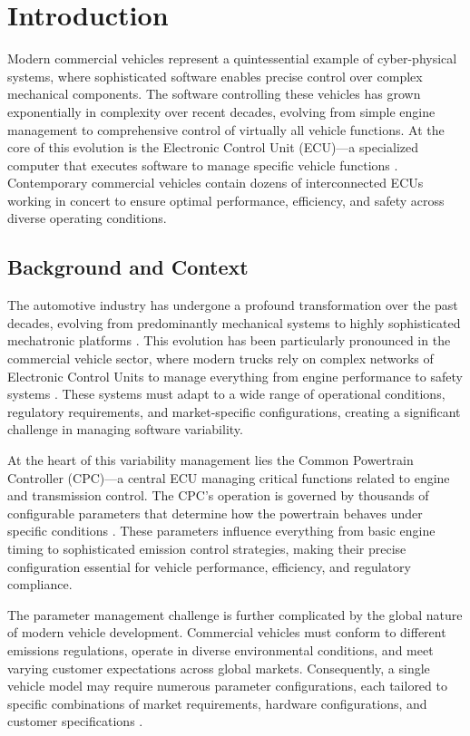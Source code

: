 \chapter{Introduction}
\label{chap:introduction}

Modern commercial vehicles represent a quintessential example of cyber-physical systems, where sophisticated software enables precise control over complex mechanical components. The software controlling these vehicles has grown exponentially in complexity over recent decades, evolving from simple engine management to comprehensive control of virtually all vehicle functions. At the core of this evolution is the Electronic Control Unit (ECU)—a specialized computer that executes software to manage specific vehicle functions \cite{broy2006challenges}. Contemporary commercial vehicles contain dozens of interconnected \acp{ECU} working in concert to ensure optimal performance, efficiency, and safety across diverse operating conditions.

\section{Background and Context}
\label{sec:background}

The automotive industry has undergone a profound transformation over the past decades, evolving from predominantly mechanical systems to highly sophisticated mechatronic platforms \cite{pretschner2007software}. This evolution has been particularly pronounced in the commercial vehicle sector, where modern trucks rely on complex networks of Electronic Control Units to manage everything from engine performance to safety systems \cite{broy2006challenges}. These systems must adapt to a wide range of operational conditions, regulatory requirements, and market-specific configurations, creating a significant challenge in managing software variability.

At the heart of this variability management lies the Common Powertrain Controller (\ac{CPC})—a central \ac{ECU} managing critical functions related to engine and transmission control. The \ac{CPC}'s operation is governed by thousands of configurable parameters that determine how the powertrain behaves under specific conditions \cite{staron2021automotive}. These parameters influence everything from basic engine timing to sophisticated emission control strategies, making their precise configuration essential for vehicle performance, efficiency, and regulatory compliance.

The parameter management challenge is further complicated by the global nature of modern vehicle development. Commercial vehicles must conform to different emissions regulations, operate in diverse environmental conditions, and meet varying customer expectations across global markets. Consequently, a single vehicle model may require numerous parameter configurations, each tailored to specific combinations of market requirements, hardware configurations, and customer specifications \cite{trovao2024evolution}.

